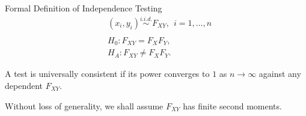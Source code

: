 \documentclass[mathserif,t]{beamer}
\begin{document}
\begin{frame}{Formal Definition of Independence Testing}
\pause
\begin{align*}
& (x_{i},y_{i}) \stackrel{i.i.d.}{\sim} F_{XY}, \ \ i=1, \ldots, n\\
& \\
& H_{0}: F_{XY}=F_{X}F_{Y},\\
& H_{A}: F_{XY} \neq F_{X}F_{Y}.
\end{align*}

\pause
\medskip
A test is universally consistent if its power converges to $1$ as $n \rightarrow \infty$ against any dependent $F_{XY}$.

\pause
\medskip
Without loss of generality, we shall assume $F_{XY}$ has finite second moments.


\end{frame}
\end{document}
